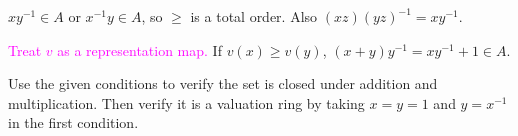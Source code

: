 \begin{exercise}\label{ex5.30}
	$xy^{-1}\in A$ or $x^{-1}y\in A$, so $\geqslant$ is a total order. Also $(xz)(yz)^{-1}=xy^{-1}$.
	
	\textcolor{magenta}{Treat $v$ as a representation map.} If $v(x)\geqslant v(y)$, $(x+y)y^{-1}=xy^{-1}+1\in A$.
\end{exercise}

\begin{exercise}\label{ex5.31}
	Use the given conditions to verify the set is closed under addition and multiplication. Then verify it is a valuation ring by taking $x=y=1$ and $y=x^{-1}$ in the first condition.
\end{exercise}

\begin{exercise}\label{ex5.32}
	
\end{exercise}

\begin{exercise}\label{ex5.33}
	
\end{exercise}

\begin{exercise}\label{ex5.34}
	
\end{exercise}

\begin{exercise}\label{ex5.35}
	
\end{exercise}

